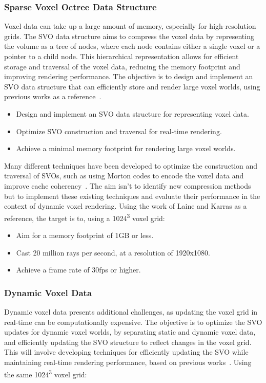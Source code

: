 \documentclass{article}
\begin{document}
\subsubsection{Sparse Voxel Octree Data Structure}
Voxel data can take up a large amount of memory, especially for high-resolution grids. The SVO data structure aims to compress the voxel data by representing the volume as a tree of nodes, where each node contains either a single voxel or a pointer to a child node. This hierarchical representation allows for efficient storage and traversal of the voxel data, reducing the memory footprint and improving rendering performance. The objective is to design and implement an SVO data structure that can efficiently store and render large voxel worlds, using previous works as a reference~\cite{Laine_Karras_2010}.

\begin{itemize}
    \item Design and implement an SVO data structure for representing voxel data.
    \item Optimize SVO construction and traversal for real-time rendering.
    \item Achieve a minimal memory footprint for rendering large voxel worlds.
\end{itemize}

Many different techniques have been developed to optimize the construction and traversal of SVOs, such as using Morton codes to encode the voxel data and improve cache coherency~\cite{Laine_Karras_2010}. The aim isn't to identify new compression methods but to implement these existing techniques and evaluate their performance in the context of dynamic voxel rendering. Using the work of Laine and Karras as a reference, the target is to, using a 1024\textsuperscript{3} voxel grid:

\begin{itemize}
    \item Aim for a memory footprint of 1GB or less.
    \item Cast 20 million rays per second, at a resolution of 1920x1080.
    \item Achieve a frame rate of 30fps or higher.
\end{itemize}

\subsubsection{Dynamic Voxel Data}
Dynamic voxel data presents additional challenges, as updating the voxel grid in real-time can be computationally expensive. The objective is to optimize the SVO updates for dynamic voxel worlds, by separating static and dynamic voxel data, and efficiently updating the SVO structure to reflect changes in the voxel grid. This will involve developing techniques for efficiently updating the SVO while maintaining real-time rendering performance, based on previous works~\cite{Crassin_2012}. Using the same 1024\textsuperscript{3} voxel grid:
\end{document}
